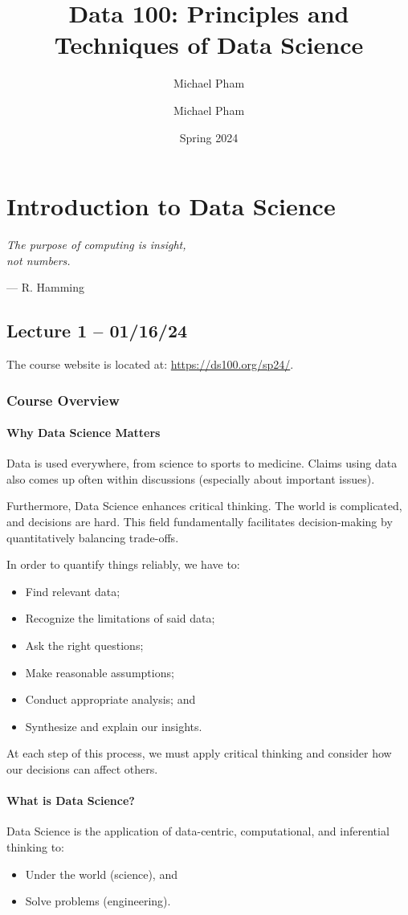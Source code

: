 \documentclass[openany]{book}
\title{#1}
\author{Michael Pham}
\date{#2}
\renewcommand{\mytitle}[2]{%
	\title{#1}
	\author{Michael Pham}
	\date{#2}
	\maketitle
	\newpage
	\mytoc
	\newpage
}
\begin{document}
\mytitle{Data 100: Principles and Techniques of Data Science}{Spring 2024}

\chapter{Introduction to Data Science}
\epigraph{\textit{The purpose of computing is insight,\\not numbers.}}{--- R. Hamming}

\section{Lecture 1 -- 01/16/24}
The course website is located at: \url{https://ds100.org/sp24/}.

\subsection{Course Overview}

\subsubsection{Why Data Science Matters}
Data is used everywhere, from science to sports to medicine. Claims using data also comes up often within discussions (especially about important issues).

Furthermore, Data Science enhances critical thinking. The world is complicated, and decisions are hard. This field fundamentally facilitates decision-making by quantitatively balancing trade-offs.

In order to quantify things reliably, we have to:
\begin{itemize}
	\item Find relevant data;
	\item Recognize the limitations of said data;
	\item Ask the right questions;
	\item Make reasonable assumptions;
	\item Conduct appropriate analysis; and
	\item Synthesize and explain our insights.
\end{itemize}

At each step of this process, we must apply critical thinking and consider how our decisions can affect others.

\newpage

\subsubsection{What is Data Science?}
\begin{defn}\label{def: data science}
	Data Science is the application of data-centric, computational, and inferential thinking to:
	\begin{itemize}
		\item Under the world (science), and
		\item Solve problems (engineering).
	\end{itemize}
\end{defn}
\end{document}
